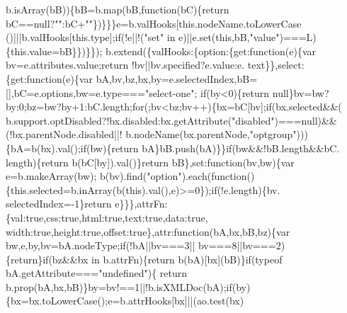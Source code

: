 \begin{DoxyCode}
      b.isArray(bB))\{bB=b.map(bB,\textcolor{keyword}{function}(bC)\{\textcolor{keywordflow}{return} bC==null?\textcolor{stringliteral}{""}:bC+\textcolor{stringliteral}{""}\})\}\}\}e=b.valHooks[\textcolor{keyword}{this}.nodeName.toLowerCase
      ()]||b.valHooks[this.type];\textcolor{keywordflow}{if}(!e||!(\textcolor{stringliteral}{"set"} in e)||e.set(\textcolor{keyword}{this},bB,\textcolor{stringliteral}{"value"})===L)\{this.value=bB\}\})\}\});
      b.extend(\{valHooks:\{option:\{\textcolor{keyword}{get}:\textcolor{keyword}{function}(e)\{var bv=e.attributes.value;\textcolor{keywordflow}{return} !bv||bv.specified?e.value:e.
      text\}\},select:\{\textcolor{keyword}{get}:\textcolor{keyword}{function}(e)\{var bA,bv,bz,bx,by=e.selectedIndex,bB=[],bC=e.options,bw=e.type===\textcolor{stringliteral}{"select-one"};\textcolor{keywordflow}{
      if}(by<0)\{\textcolor{keywordflow}{return} null\}bv=bw?by:0;bz=bw?by+1:bC.length;\textcolor{keywordflow}{for}(;bv<bz;bv++)\{bx=bC[bv];\textcolor{keywordflow}{if}(bx.selected&&(
      b.support.optDisabled?!bx.disabled:bx.getAttribute(\textcolor{stringliteral}{"disabled"})===null)&&(!bx.parentNode.disabled||!
      b.nodeName(bx.parentNode,\textcolor{stringliteral}{"optgroup"})))\{bA=b(bx).val();\textcolor{keywordflow}{if}(bw)\{\textcolor{keywordflow}{return} bA\}bB.push(bA)\}\}\textcolor{keywordflow}{if}(bw&&!bB.length&&bC.
      length)\{\textcolor{keywordflow}{return} b(bC[by]).val()\}\textcolor{keywordflow}{return} bB\},\textcolor{keyword}{set}:\textcolor{keyword}{function}(bv,bw)\{var e=b.makeArray(bw);
      b(bv).find(\textcolor{stringliteral}{"option"}).each(\textcolor{keyword}{function}()\{this.selected=b.inArray(b(\textcolor{keyword}{this}).val(),e)>=0\});\textcolor{keywordflow}{if}(!e.length)\{bv.
      selectedIndex=-1\}\textcolor{keywordflow}{return} e\}\}\},attrFn:\{val:\textcolor{keyword}{true},css:\textcolor{keyword}{true},html:\textcolor{keyword}{true},text:\textcolor{keyword}{true},data:\textcolor{keyword}{true},
      width:\textcolor{keyword}{true},height:\textcolor{keyword}{true},offset:\textcolor{keyword}{true}\},attr:\textcolor{keyword}{function}(bA,bx,bB,bz)\{var bw,e,by,bv=bA.nodeType;\textcolor{keywordflow}{if}(!bA||bv===3||
      bv===8||bv===2)\{\textcolor{keywordflow}{return}\}\textcolor{keywordflow}{if}(bz&&bx in b.attrFn)\{\textcolor{keywordflow}{return} b(bA)[bx](bB)\}\textcolor{keywordflow}{if}(typeof bA.getAttribute===\textcolor{stringliteral}{"undefined"})\{\textcolor{keywordflow}{
      return} b.prop(bA,bx,bB)\}by=bv!==1||!b.isXMLDoc(bA);\textcolor{keywordflow}{if}(by)\{bx=bx.toLowerCase();e=b.attrHooks[bx]||(ao.test(bx)

\end{DoxyCode}
